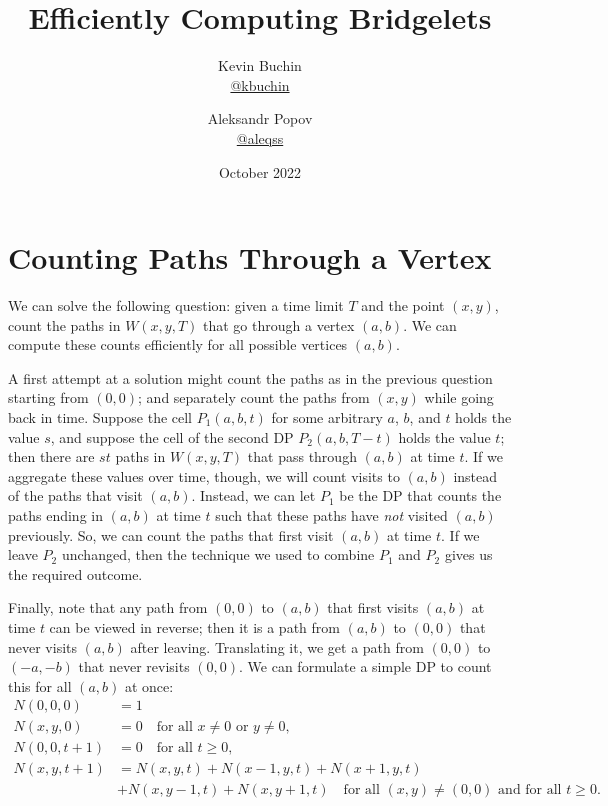 \documentclass[11pt,a4paper,twoside,british]{article}
\title{Efficiently Computing Bridgelets}
\author{Kevin Buchin\\\href{https://github.com/kbuchin/}{@kbuchin} \and Aleksandr Popov\\\href{https://github.com/aleqss/}{@aleqss}}
\date{October 2022}
\begin{document}
\maketitle

\section{Counting Paths Through a Vertex}
We can solve the following question: given a time limit $T$ and the point
$(x, y)$, count the paths in $W(x, y, T)$ that go through a vertex $(a, b)$.
We can compute these counts efficiently for all possible vertices $(a, b)$.

A first attempt at a solution might count the paths as in the previous question
starting from $(0, 0)$; and separately count the paths from $(x, y)$ while going
back in time.
Suppose the cell $P_1(a, b, t)$ for some arbitrary $a$, $b$, and $t$ holds the
value $s$, and suppose the cell of the second DP $P_2(a, b, T - t)$ holds the
value $t$; then there are $st$ paths in $W(x, y, T)$ that pass through $(a, b)$
at time $t$.
If we aggregate these values over time, though, we will count visits to $(a, b)$
instead of the paths that visit $(a, b)$.
Instead, we can let $P_1$ be the DP that counts the paths ending in $(a, b)$ at
time $t$ such that these paths have \emph{not} visited $(a, b)$ previously.
So, we can count the paths that first visit $(a, b)$ at time $t$.
If we leave $P_2$ unchanged, then the technique we used to combine $P_1$ and
$P_2$ gives us the required outcome.

Finally, note that any path from $(0, 0)$ to $(a, b)$ that first visits $(a, b)$
at time $t$ can be viewed in reverse; then it is a path from $(a, b)$ to
$(0, 0)$ that never visits $(a, b)$ after leaving.
Translating it, we get a path from $(0, 0)$ to $(-a, -b)$ that never revisits
$(0, 0)$.
We can formulate a simple DP to count this for all $(a, b)$ at once:
\begin{align*}
N(0, 0, 0) &= 1\\
N(x, y, 0) &= 0 \quad\text{for all $x \neq 0$ or $y \neq 0$,}\\
N(0, 0, t + 1) &= 0 \quad\text{for all $t \geq 0$,}\\
N(x, y, t + 1) &= N(x, y, t) + N(x - 1, y, t) + N(x + 1, y, t)\\
&+ N(x, y - 1, t) + N(x, y + 1, t)
\quad\text{for all $(x, y) \neq (0, 0)$ and for all $t \geq 0$.}\\
\end{align*}
\end{document}
